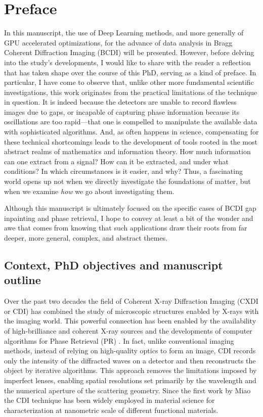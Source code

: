 \section{Preface}\label{chp:intro}

In this manuscript, the use of Deep Learning methods, and more generally of GPU accelerated optimizations, for the advance of 
data analysis in Bragg Coherent Diffraction Imaging (BCDI) will be presented. However, before delving into the 
study’s developments, I would like to share with the reader a reflection that has taken shape over the course of this 
PhD, serving as a kind of preface. In particular, I have come to observe that, unlike other more fundamental 
scientific investigations, this work originates from the practical limitations of the technique in question. 
It is indeed because the detectors are unable to record flawless images due to gaps, or incapable of 
capturing phase information because its oscillations are too rapid—that one is compelled to manipulate the available 
data with sophisticated algorithms. And, as often happens in science, compensating for these technical shortcomings 
leads to the development of tools rooted in the most abstract realms of mathematics and information theory. How much 
information can one extract from a signal? How can it be extracted, and under what conditions? In which 
circumstances is it easier, and why? Thus, a fascinating world opens up not when we directly investigate the foundations 
of matter, but when we examine \textit{how} we go about investigating them. 

Although this manuscript is ultimately focused on the specific cases of BCDI gap inpainting and phase retrieval, 
I hope to convey at least a bit of the wonder and awe that comes from knowing that such applications draw their roots 
from far deeper, more general, complex, and abstract themes.

\subsection{Context, PhD objectives and manuscript outline}

Over the past two decades the field of Coherent X-ray Diffraction Imaging (CXDI or CDI) has combined the study of microscopic structures 
enabled by X-rays with the imaging world. This powerful connection has been enabled by the availability of high-brilliance and 
coherent X-ray sources and the developments of computer algorithms for Phase Retrieval (PR) \cite{fienup_reconstruction_1978, fienup_phase_1982,Luke_2004}. 
In fact, unlike conventional imaging methods, 
instead of relying on high-quality optics to form an image, CDI records only the intensity of the diffracted waves on 
a detector and then reconstructs the object by iterative algorithms. 
This approach removes the limitations imposed by imperfect lenses, enabling spatial resolutions set primarily by the 
wavelength and the numerical aperture of the scattering geometry. 
Since the first work by Miao \cite{Miao1998} the CDI technique has been widely employed in material science for 
characterization at nanometric scale of different functional materials. \cite{Neutze2000, Chapman2005, Schroer2008, Rodriguez2015}

